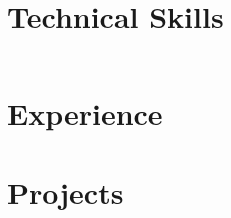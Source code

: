 \documentclass{resume}
\begin{document}







\section{Technical Skills}
    \begin{itemize}[leftmargin=0.15in, label={}]
    \small{\item{
        \begin{tabular}{@{}p{2.0in} l@{}}
            
            
            
            
        \end{tabular}
    }}
    \end{itemize}
    \vspace{-16pt}

\section{Experience}
  \resumeSubHeadingListStart
    
    
  \resumeSubHeadingListEnd

\section{Projects}
    \resumeSubHeadingListStart
      
      
      
      
    \resumeSubHeadingListEnd


\end{document}
